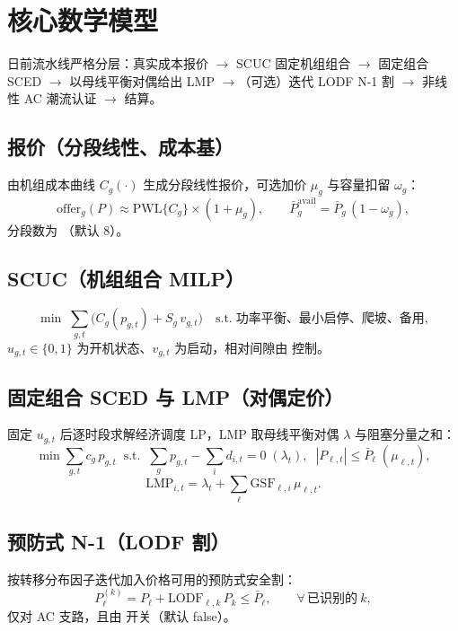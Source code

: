 \documentclass[UTF8,fontset=fandol,a4paper,11pt]{ctexart}
\begin{document}
\section{核心数学模型}
日前流水线严格分层：真实成本报价 $\to$ SCUC 固定机组组合 $\to$ 固定组合 SCED $\to$
以母线平衡对偶给出 LMP $\to$（可选）迭代 LODF N-1 割 $\to$ 非线性 AC 潮流认证 $\to$ 结算。

\subsection{报价（分段线性、成本基）}
由机组成本曲线 $C_g(\cdot)$ 生成分段线性报价，可选加价 $\mu_g$ 与容量扣留 $\omega_g$：
\begin{equation}
\text{offer}_g(P)\approx \text{PWL}\{C_g\}\times(1+\mu_g),\qquad
\bar P_g^{\text{avail}}=\bar P_g\,(1-\omega_g),
\end{equation}
分段数为 （默认 8）。

\subsection{SCUC（机组组合 MILP）}
\begin{equation}
\min\;\sum_{g,t}\big(C_g(p_{g,t})+S_g\,v_{g,t}\big)\quad\text{s.t.}\;
\text{功率平衡、最小启停、爬坡、备用},
\end{equation}
$u_{g,t}\in\{0,1\}$ 为开机状态、$v_{g,t}$ 为启动，相对间隙由  控制。

\subsection{固定组合 SCED 与 LMP（对偶定价）}
固定 $u_{g,t}$ 后逐时段求解经济调度 LP，LMP 取母线平衡对偶 $\lambda$ 与阻塞分量之和：
\begin{equation}
\min\sum_{g,t}c_g\,p_{g,t}\;\;\text{s.t.}\;\;
\textstyle\sum_g p_{g,t}-\sum_i d_{i,t}=0\;(\lambda_t),\;\; |P_{\ell,t}|\le\bar P_\ell\;(\mu_{\ell,t}),
\end{equation}
\begin{equation}
\text{LMP}_{i,t}=\lambda_t+\sum_{\ell}\text{GSF}_{\ell,i}\,\mu_{\ell,t}.
\end{equation}

\subsection{预防式 N-1（LODF 割）}
按转移分布因子迭代加入价格可用的预防式安全割：
\begin{equation}
P_\ell^{(k)}=P_\ell+\text{LODF}_{\ell,k}\,P_k\le\bar P_\ell,\qquad \forall\,\text{已识别的}~k,
\end{equation}
仅对 AC 支路，且由  开关（默认 false）。
\end{document}
